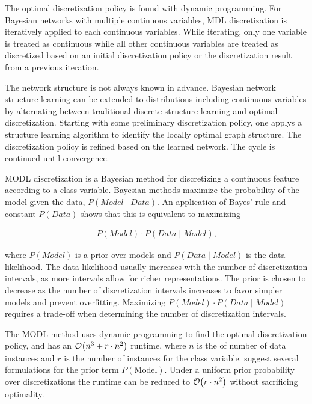 The optimal discretization policy is found with dynamic programming.
For Bayesian networks with multiple continuous variables, MDL discretization is iteratively applied to each continuous variables.
While iterating, only one variable is treated as continuous while all other continuous variables are treated as discretized based on an initial discretization policy or the discretization result from a previous iteration.

The network structure is not always known in advance.
Bayesian network structure learning can be extended to distributions including continuous variables by alternating between traditional discrete structure learning and optimal discretization.
Starting with some preliminary discretization policy, one applys a structure learning algorithm to identify the locally optimal graph structure.
The discretization policy is refined based on the learned network.
The cycle is continued until convergence.

MODL discretization \citep{Boulle_2006} is a Bayesian method for discretizing a continuous feature according to a class variable.
Bayesian methods maximize the probability of the model given the data, $P(\textit{Model} \mid \textit{Data})$.
An application of Bayes' rule and constant $P(\textit{Data})$ shows that this is equivalent to maximizing

\begin{align}
P(\textit{Model}) \cdot P(\textit{Data} \mid \textit{Model})\text{,}
\end{align}

\noindent
where $P(\textit{Model})$ is a prior over models and ${P(\textit{Data} \mid \textit{Model})}$ is the data likelihood.
The data likelihood usually increases with the number of discretization intervals, as more intervals allow for richer representations.
The prior is chosen to decrease as the number of discretization intervals increases to favor simpler models and prevent overfitting.
Maximizing ${P(\textit{Model}) \cdot P(\textit{Data} \mid \textit{Model})}$ requires a trade-off when determining the number of discretization intervals.

The MODL method uses dynamic programming to find the optimal discretization policy, and has an $\bigo\paren{n^3 + r \cdot n^2}$ runtime, where $n$ is the of number of data instances and $r$ is the number of instances for the class variable.
\cite{Lustgarten_2011} suggest several formulations for the prior term $P(\text{Model})$.
Under a uniform prior probability over discretizations the runtime can be reduced to $\bigo\paren{r \cdot n^2}$ without sacrificing optimality.

